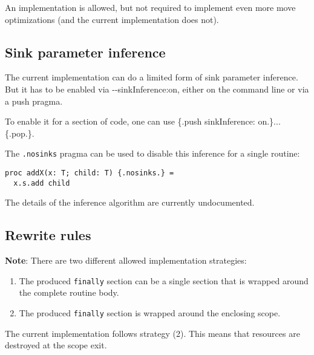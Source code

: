 An implementation is allowed, but not required to implement even more
move optimizations (and the current implementation does not).

\hypertarget{sink-parameter-inference}{%
\subsection{Sink parameter inference}\label{sink-parameter-inference}}

The current implementation can do a limited form of sink parameter
inference. But it has to be enabled via {-\/-sinkInference:on}, either
on the command line or via a {push} pragma.

To enable it for a section of code, one can use {\{.push sinkInference:
on.\}}...{\{.pop.\}}.

The \texttt{.nosinks} pragma can be used to disable this inference for a
single routine:

\begin{verbatim}
proc addX(x: T; child: T) {.nosinks.} =
  x.s.add child
\end{verbatim}

The details of the inference algorithm are currently undocumented.

\hypertarget{rewrite-rules}{%
\subsection{Rewrite rules}\label{rewrite-rules}}

\textbf{Note}: There are two different allowed implementation
strategies:

\begin{enumerate}
\def\labelenumi{\arabic{enumi}.}
\tightlist
\item
  The produced \texttt{finally} section can be a single section that is
  wrapped around the complete routine body.
\item
  The produced \texttt{finally} section is wrapped around the enclosing
  scope.
\end{enumerate}

The current implementation follows strategy (2). This means that
resources are destroyed at the scope exit.

